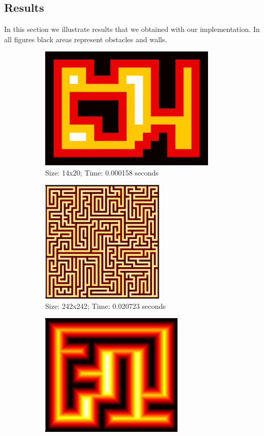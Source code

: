 \documentclass[a4paper]{article}
\begin{document}
\subsection*{Results}
In this section we illustrate results that we obtained with our implementation. In all figures black areas represent obstacles and walls.

\begin{figure}[H]
\centering
	\begin{subfigure}[t]{3in}
		\centering
		\includegraphics[height=2.3in]{bf-simple}
		\caption{Size: 14x20; Time: 0.000158 seconds}\label{fig:bf-a}
	\end{subfigure}
	\quad
	\begin{subfigure}[t]{3in}
		\centering
		\includegraphics[height=2.3in]{bf-maze}
		\caption{Size: 242x242; Time: 0.020723 seconds}\label{fig:bf-b}
	\end{subfigure}
	\quad
	\begin{subfigure}[t]{3in}
		\centering
		\includegraphics[height=2.3in]{bf-mazeBig}

\end{subfigure}
\end{figure}
\end{document}
